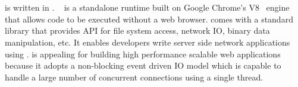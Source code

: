








\section{\nodejs}

\cb is written in \nodejs. \nodejs~\cite{tilkov2010node} is a standalone \js
runtime built on Google Chrome's V8~\cite{v8} \js engine that allows \js code
to be executed without a web browser.  \nodejs comes with a standard library
that provides API for file system access, network IO, binary data
manipulation, etc. It enables developers write server side network
applications using \js.  \nodejs is appealing for building high performance
scalable web applications because it adopts a non-blocking event driven IO
model which is capable  to handle a large number of concurrent connections
using a single thread.

